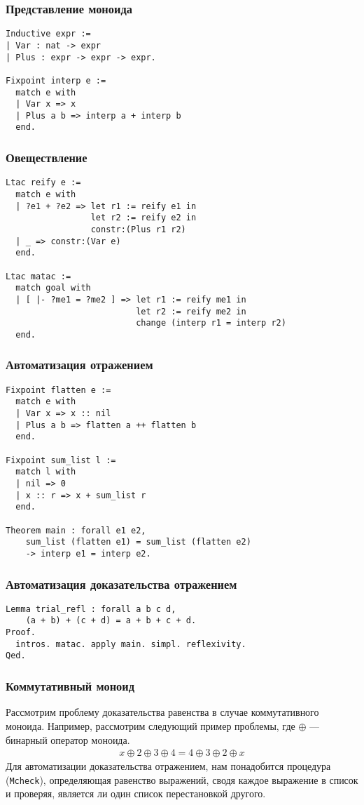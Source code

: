 \documentclass{beamer}
\begin{document}
\begin{frame}[fragile]
  \frametitle{Представление моноида}
\begin{verbatim}
Inductive expr :=
| Var : nat -> expr
| Plus : expr -> expr -> expr.

Fixpoint interp e :=
  match e with
  | Var x => x
  | Plus a b => interp a + interp b
  end.
\end{verbatim}
\end{frame}

\begin{frame}[fragile]
  \frametitle{Овеществление}
\begin{verbatim}
Ltac reify e :=
  match e with
  | ?e1 + ?e2 => let r1 := reify e1 in
                 let r2 := reify e2 in
                 constr:(Plus r1 r2)
  | _ => constr:(Var e)
  end.

Ltac matac :=
  match goal with
  | [ |- ?me1 = ?me2 ] => let r1 := reify me1 in
                          let r2 := reify me2 in
                          change (interp r1 = interp r2)
  end.
\end{verbatim}
\end{frame}

\begin{frame}[fragile]
  \frametitle{Автоматизация отражением}
  \vspace{-.5em}
\begin{verbatim}
Fixpoint flatten e :=
  match e with
  | Var x => x :: nil
  | Plus a b => flatten a ++ flatten b
  end.

Fixpoint sum_list l :=
  match l with
  | nil => 0
  | x :: r => x + sum_list r
  end.

Theorem main : forall e1 e2,
    sum_list (flatten e1) = sum_list (flatten e2)
    -> interp e1 = interp e2.
\end{verbatim}
\end{frame}

\begin{frame}[fragile]
  \frametitle{Автоматизация доказательства отражением}
\begin{verbatim}
Lemma trial_refl : forall a b c d,
    (a + b) + (c + d) = a + b + c + d.
Proof.
  intros. matac. apply main. simpl. reflexivity.
Qed.
\end{verbatim}
\end{frame}

\begin{frame}
  \frametitle{Коммутативный моноид}
  Рассмотрим проблему доказательства равенства в случае коммутативного моноида. Например, рассмотрим следующий пример проблемы, где $\oplus$ --- бинарный оператор моноида.
  \begin{align*}
    x \oplus 2 \oplus 3 \oplus 4 = 4 \oplus 3 \oplus 2 \oplus x
  \end{align*}
  Для автоматизации доказательства отражением, нам понадобится процедура (\texttt{Mcheck}), определяющая равенство выражений, сводя каждое выражение в список и проверяя, является ли один список перестановкой другого.
\end{frame}
\end{document}
